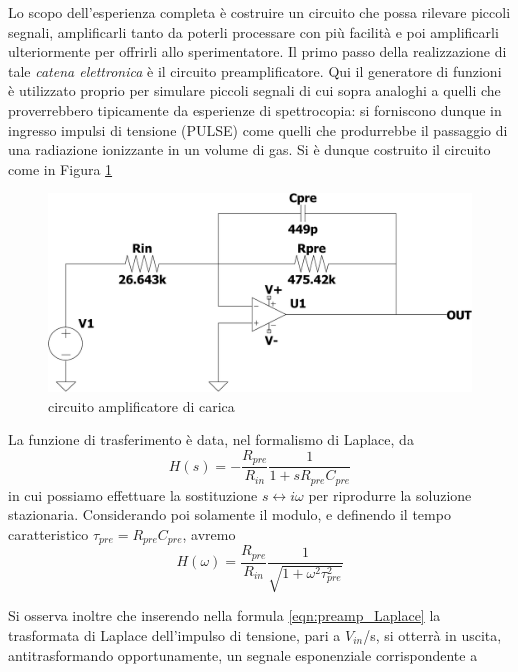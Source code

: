 \documentclass{article}
\begin{document}
Lo scopo dell'esperienza completa è costruire un circuito che possa rilevare piccoli segnali, amplificarli tanto da poterli processare con più facilità
e poi amplificarli ulteriormente per offrirli allo sperimentatore. Il primo passo della realizzazione di tale \textit{catena elettronica} è il circuito
preamplificatore. Qui il generatore di funzioni è utilizzato proprio per simulare piccoli segnali di cui sopra analoghi a quelli che proverrebbero tipicamente 
da esperienze di spettrocopia: si forniscono dunque in ingresso impulsi di tensione (PULSE) come quelli che produrrebbe il passaggio di una radiazione ionizzante in 
un volume di gas. 
Si è dunque costruito il circuito come in Figura \ref{fig:preamp}
\begin{center}
\begin{figure}[ht]
\centering
\includegraphics[scale=0.3, angle=0]{preamp.pdf}
\caption{ circuito amplificatore di carica }
\label{fig:preamp}
\end{figure}
\end{center}
La funzione di trasferimento è data, nel formalismo di Laplace, da
\begin{equation}
    \label{eqn:preamp_Laplace}
    H(s) = -\frac{R_{pre}}{R_{in}} \frac{1}{1+sR_{pre}C_{pre}}
\end{equation}
in cui possiamo effettuare la sostituzione $s \longleftrightarrow i\omega$ per riprodurre la soluzione stazionaria. Considerando poi
solamente il modulo, e definendo il tempo caratteristico $\tau_{pre}=R_{pre}C_{pre}$, avremo
\begin{equation}
    \label{eqn:preamp_trasf}
    H(\omega) = \frac{R_{pre}}{R_{in}} \frac{1}{\sqrt{1+\omega^2\tau_{pre}^2}}
\end{equation}

Si osserva inoltre che inserendo nella formula \ref{eqn:preamp_Laplace} la trasformata di Laplace dell'impulso di tensione, pari a 
$V_{in}$/s, si otterrà in uscita, antitrasformando opportunamente, un segnale esponenziale corrispondente a
\end{document}
